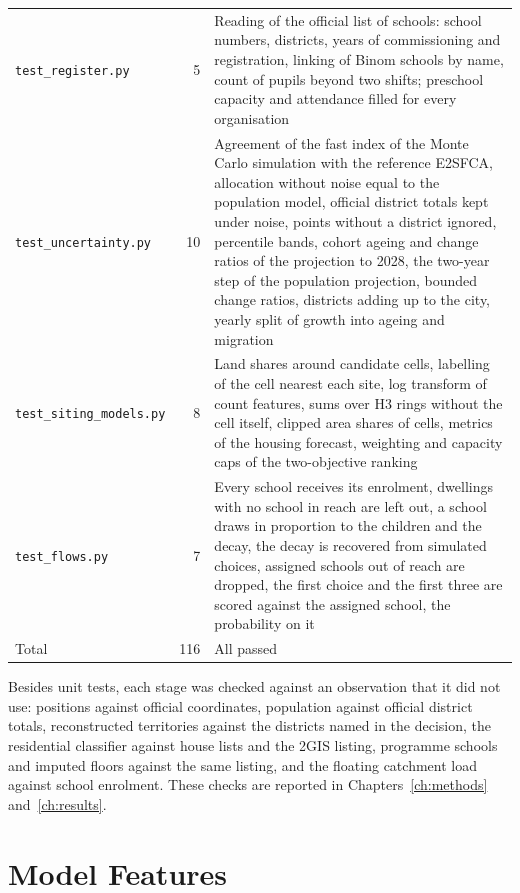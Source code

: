 \begin{table}[ht]
\begin{tabularx}{\textwidth}{>{\raggedright\arraybackslash}p{4.4cm}r>{\raggedright\arraybackslash}X}
\texttt{test\_register.py} & 5 & Reading of the official list of schools: school numbers, districts, years of commissioning and registration, linking of Binom schools by name, count of pupils beyond two shifts; preschool capacity and attendance filled for every organisation \\
\texttt{test\_uncertainty.py} & 10 & Agreement of the fast index of the Monte Carlo simulation with the reference E2SFCA, allocation without noise equal to the population model, official district totals kept under noise, points without a district ignored, percentile bands, cohort ageing and change ratios of the projection to 2028, the two-year step of the population projection, bounded change ratios, districts adding up to the city, yearly split of growth into ageing and migration \\
\texttt{test\_siting\_models.py} & 8 & Land shares around candidate cells, labelling of the cell nearest each site, log transform of count features, sums over H3 rings without the cell itself, clipped area shares of cells, metrics of the housing forecast, weighting and capacity caps of the two-objective ranking \\
\texttt{test\_flows.py} & 7 & Every school receives its enrolment, dwellings with no school in reach are left out, a school draws in proportion to the children and the decay, the decay is recovered from simulated choices, assigned schools out of reach are dropped, the first choice and the first three are scored against the assigned school, the probability on it \\
\midrule
Total & 116 & All passed \\
\bottomrule
\end{tabularx}
\end{table}

Besides unit tests, each stage was checked against an observation that it did not use: positions against official coordinates, population against official district totals, reconstructed territories against the districts named in the decision, the residential classifier against house lists and the 2GIS listing, programme schools and imputed floors against the same listing, and the floating catchment load against school enrolment. These checks are reported in Chapters~\ref{ch:methods} and~\ref{ch:results}.

\chapter{Model Features}
\label{app:features}

